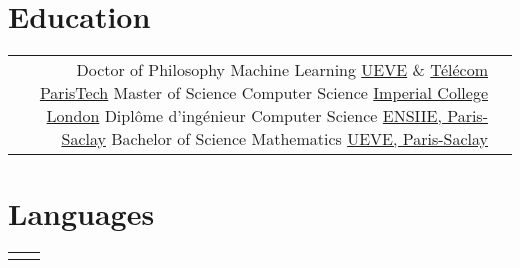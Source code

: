 \documentclass[10pt]{article} %
\begin{document}
\begin{paracol}{2}
\section{Education}
%
%
%
%
%
\begin{supertabular}{rl} %
%
%
    {Doctor of Philosophy} %
    {} %
    {Machine Learning} %
    {\href{https://www.ibisc.univ-evry.fr/}{UEVE} \&
     \href{https://ltci.telecom-paristech.fr/}{T\'el\'ecom ParisTech}}
%
%
    {Master of Science} %
    {} %
    {Computer Science} %
    {\href{http://www.imperial.ac.uk/computing}{Imperial College London}} %
%
%
    {Dipl\^ome d'ing\'enieur} %
    {} %
    {Computer Science} %
    {\href{http://www.ensiie.fr/}{ENSIIE, Paris-Saclay}}
%
%
    {Bachelor of Science} %
    {} %
    {Mathematics} %
    {\href{https://www.univ-evry.fr/accueil.html}{UEVE, Paris-Saclay}}
%
%
\end{supertabular}
%
%
\section{Languages}
\begin{supertabular}{rl} %
\end{supertabular}
%
%

\end{paracol}
\end{document}
